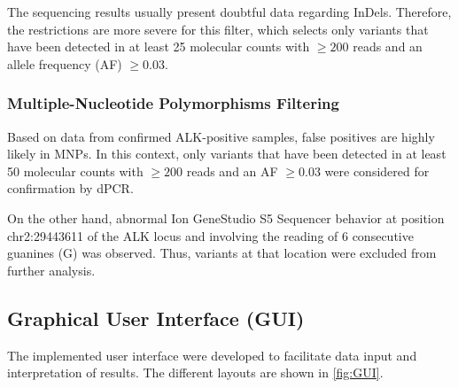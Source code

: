 The sequencing results usually present doubtful data regarding InDels. Therefore, the restrictions are more severe for this filter, which selects only variants that have been detected in at least 25 molecular counts with $\ge 200$ reads and an allele frequency (AF) $\ge 0.03$.

\subsubsection{Multiple-Nucleotide Polymorphisms Filtering}

Based on data from confirmed ALK-positive samples, false positives are highly likely in MNPs. In this context, only variants that have been detected in at least 50 molecular counts with $\ge 200$ reads and an AF $\ge 0.03$ were considered for confirmation by dPCR. 

On the other hand, abnormal Ion GeneStudio\texttrademark{} S5 Sequencer behavior at position chr2:29443611 of the ALK locus and involving the reading of 6 consecutive guanines (G) was observed. Thus, variants at that location were excluded from further analysis.

\subsection{Graphical User Interface (GUI)}

The implemented user interface were developed to facilitate data input and interpretation of results. The different layouts are shown in \autoref{fig:GUI}.

